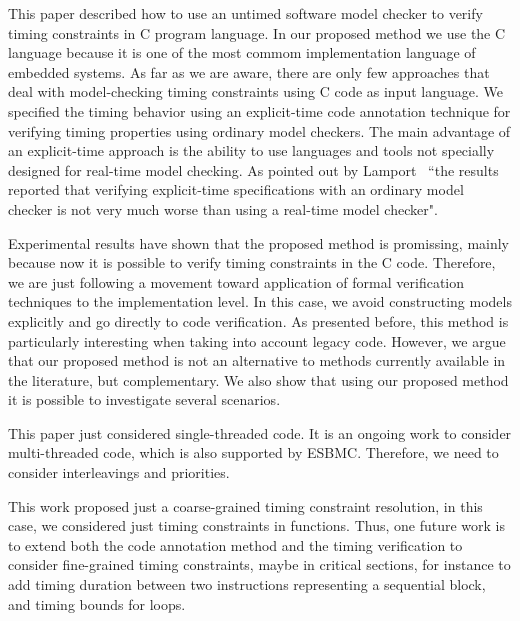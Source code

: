 \documentclass{llncs}
\begin{document}
This paper described how to use an untimed software model checker
to verify timing constraints in C program language. 
In our proposed method we use the C language because it is one of the most commom implementation language 
of embedded systems.
As far as we are aware, there are only few approaches that deal with model-checking 
timing constraints using C code as input language.
We specified the timing behavior using an explicit-time code annotation technique  
for verifying timing properties using ordinary model checkers.
The main advantage of an explicit-time approach is the ability to use languages and tools not specially 
designed for real-time model checking.
As pointed out by Lamport~\cite{Lamport05} ``the results reported that verifying explicit-time specifications 
with an ordinary model checker is not very much worse than using a real-time model checker".

Experimental results have shown that the proposed method is promissing, 
mainly because now it is possible to verify timing constraints in the C code. 
Therefore, we are just following a movement toward application of formal verification techniques 
to the implementation level. 
In this case, we avoid constructing models explicitly and go directly to code verification. 
As presented before, this method is particularly interesting when taking into account legacy code.
However, we argue that our proposed method is not an alternative to methods currently available in the literature, 
but complementary.
We also show that using our proposed method it is possible to investigate several scenarios.

This paper just considered single-threaded code. 
It is an ongoing work to consider multi-threaded code, which is also supported by ESBMC.
Therefore, we need to consider interleavings and priorities.

This work proposed just a coarse-grained timing constraint resolution, in this case, we considered just 
timing constraints in functions. 
Thus, one future work is to extend both the code annotation method and the timing verification 
to consider fine-grained timing constraints, maybe in critical sections, for instance 
to add timing duration between two instructions representing a sequential block, 
and timing bounds for loops.



\linespread{1}


\end{document}
